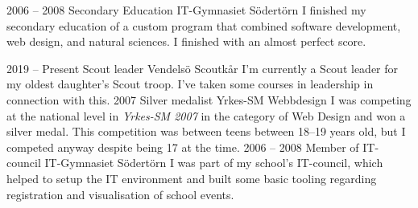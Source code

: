 \documentclass[9pt]{template} %
\begin{document}


\begin{entrylist}
  \entry
    {2006 -- 2008}
    {Secondary Education}
    {IT-Gymnasiet Södertörn}
    {I finished my secondary education of a custom program that combined
      software development, web design, and natural sciences. I finished with
      an almost perfect score.}
\end{entrylist}



\begin{entrylist}
  \entry
    {2019 -- Present}
    {Scout leader}
    {Vendelsö Scoutkår}
    {I'm currently a Scout leader for my oldest daughter's Scout troop. I've
      taken some courses in leadership in connection with this.}
  \entry
    {2007}
    {Silver medalist}
    {Yrkes-SM Webbdesign}
    {I was competing at the national level in \textit{Yrkes-SM 2007} in the
      category of Web Design and won a silver medal. This competition was
      between teens between 18--19 years old, but I competed anyway despite
      being 17 at the time.}
  \entry
    {2006 -- 2008}
    {Member of IT-council}
    {IT-Gymnasiet Södertörn}
    {I was part of my school's IT-council, which helped to setup the IT
      environment and built some basic tooling regarding registration and
      visualisation of school events.}
\end{entrylist}

\end{document}
